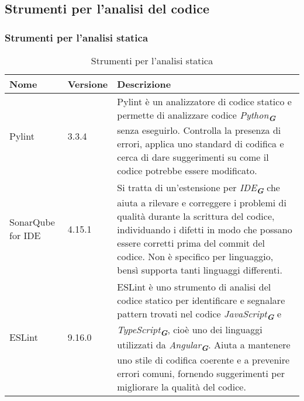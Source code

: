 \newpage

\subsection{Strumenti per l’analisi del codice}

\subsubsection{Strumenti per l’analisi statica}
\label{subsec:strumenti_analisi_statica}
\begin{table}[h!]
    \centering
    \renewcommand{\arraystretch}{1.6} %
    \begin{tabularx}{\textwidth}{|p{2cm}|p{2cm}|X|} \hline
    \rowcolor[HTML]{FFD700} 
    \textbf{Nome} & \textbf{Versione} & \textbf{Descrizione} \\ \hline
    Pylint & 3.3.4 & Pylint è un analizzatore di codice statico e permette di
                    analizzare codice \emph{Python}\textsubscript{\textbf{\textit{G}}} senza eseguirlo. Controlla la presenza
                    di errori, applica uno standard di codifica e cerca di dare
                    suggerimenti su come il codice potrebbe essere modificato. \\ \hline
    SonarQube for IDE & 4.15.1 & Si tratta di un’estensione per \emph{IDE}\textsubscript{\textbf{\textit{G}}} 
                                che aiuta a rilevare
                                e correggere i problemi di qualità durante la scrittura
                                del codice, individuando i difetti in modo che possano
                                essere corretti prima del commit del codice. Non è specifico
                                per linguaggio, bensì supporta tanti linguaggi differenti. \\ \hline
    ESLint & 9.16.0 & ESLint è uno strumento di analisi del codice statico per identificare
                    e segnalare pattern trovati nel codice \emph{JavaScript}\textsubscript{\textbf{\textit{G}}}
                    e \emph{TypeScript}\textsubscript{\textbf{\textit{G}}}, cioè uno 
                    dei linguaggi utilizzati da \emph{Angular}\textsubscript{\textbf{\textit{G}}}. Aiuta a mantenere
                    uno stile di codifica
                    coerente e a prevenire errori comuni, fornendo suggerimenti per migliorare
                    la qualità del codice. \\ \hline
    \end{tabularx}
    \caption{Strumenti per l’analisi statica}
\end{table}

